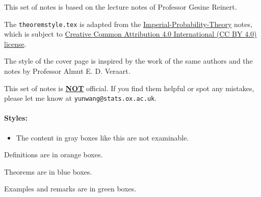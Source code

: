 \thispagestyle{empty}
This set of notes is based on the lecture notes of Professor Gesine Reinert.

The \verb|theoremstyle.tex| is adapted from the \href{https://github.com/Samuel-CHLam/Imperial-Probability-Theory}{Imperial-Probability-Theory} notes, which is subject to \href{https://github.com/Samuel-CHLam/Imperial-Probability-Theory#license}{Creative Common Attribution 4.0 International (CC BY 4.0) license}.  

The style of the cover page is inspired by the work of the same authors and the notes by Professor Almut E. D. Veraart.


This set of notes is \underline{\bf NOT} official. If you find them helpful or spot any mistakes, please let me know at \verb|yunwang@stats.ox.ac.uk|.

\paragraph{Styles:}
\begin{unexaminable}
\begin{itemize}
    \item The content in gray boxes like this are not examinable.
\end{itemize}
\end{unexaminable}  
 
\begin{definition}
    Definitions are in orange boxes.
\end{definition}
\begin{theorem}
    Theorems are in blue boxes.
\end{theorem}

\begin{example}
    Examples and remarks are in green boxes. 
\end{example}



